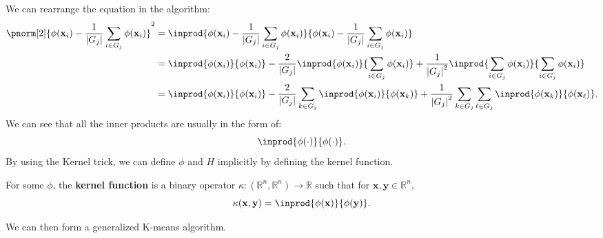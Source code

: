 \documentclass{huhtakm-template-book-v2}
\begin{document}
    We can rearrange the equation in the algorithm:
    \begin{align*}
        \pnorm[2]{\phi(\mathbf{x}_{i}) - \frac{1}{\abs{G_{j}}}\sum_{i\in G_{j}}\phi(\mathbf{x}_{i})}^{2} &= \inprod{\phi(\mathbf{x}_{i}) - \frac{1}{\abs{G_{j}}}\sum_{i\in G_{j}}\phi(\mathbf{x}_{i})}{\phi(\mathbf{x}_{i}) - \frac{1}{\abs{G_{j}}}\sum_{i\in G_{j}}\phi(\mathbf{x}_{i})}\\
        &=\inprod{\phi(\mathbf{x}_{i})}{\phi(\mathbf{x}_{i})}-\frac{2}{\abs{G_{j}}}\inprod{\phi(\mathbf{x}_{i})}{\sum_{i\in G_{j}}\phi(\mathbf{x}_{i})}+\frac{1}{\abs{G_{j}}^{2}}\inprod{\sum_{i\in G_{j}}\phi(\mathbf{x}_{i})}{\sum_{i\in G_{j}}\phi(\mathbf{x}_{i})}\\
        &=\inprod{\phi(\mathbf{x}_{i})}{\phi(\mathbf{x}_{i})}-\frac{2}{\abs{G_{j}}}\sum_{k\in G_{j}}\inprod{\phi(\mathbf{x}_{i})}{\phi(\mathbf{x}_{k})}+\frac{1}{\abs{G_{j}}^{2}}\sum_{k\in G_{j}}\sum_{\ell\in G_{j}}\inprod{\phi(\mathbf{x}_{k})}{\phi(\mathbf{x}_{\ell})}.
    \end{align*}
    We can see that all the inner products are usually in the form of:
    \begin{equation*}
        \inprod{\phi(\cdot)}{\phi(\cdot)}.
    \end{equation*}
    By using the Kernel trick, we can define $\phi$ and $H$ implicitly by defining the kernel function.
    \begin{defn}
        For some $\phi$, the \textbf{kernel function} is a binary operator $\kappa: (\mathbb{R}^{n},\mathbb{R}^{n})\to\mathbb{R}$ such that for $\mathbf{x},\mathbf{y}\in\mathbb{R}^{n}$,
        \begin{equation*}
            \kappa(\mathbf{x},\mathbf{y})=\inprod{\phi(\mathbf{x})}{\phi(\mathbf{y})}.
        \end{equation*}
    \end{defn}
    We can then form a generalized K-means algorithm.
\end{document}
